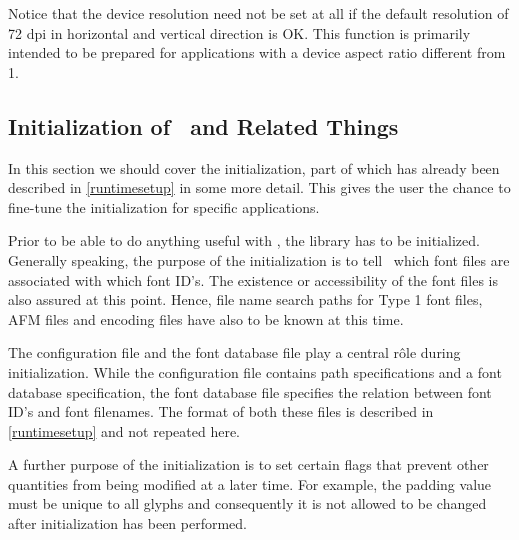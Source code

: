Notice that the device resolution need not be set at all if the default
resolution of 72 dpi in horizontal and vertical direction is OK. This function
is primarily intended to be prepared for applications with a device aspect
ratio different from 1.
 
\subsection{Initialization of \tonelib\ and Related Things}
\label{initialization}%
In this section we should cover the initialization, part of which has already
been described in \ref{runtimesetup} in some more detail. This gives the user
the chance to fine-tune the initialization for specific applications.

Prior to be able to do anything useful with \tonelib, the library has to be
initialized. Generally speaking, the purpose of the initialization is to tell
\tonelib\ which font files are associated with which font ID's. The existence
or accessibility of the font files is also assured at this point. Hence, file
name search paths for Type 1 font files, AFM files and encoding files have
also to be known at this time. 

The configuration file and the font database file play a central  r\^ole
during initialization. While the configuration file contains path
specifications and a font database specification, the font database file
specifies the relation between font ID's and font filenames.
The format of both these files is described in \ref{runtimesetup} and not
repeated here. 

A further purpose of the initialization is to set certain flags that prevent
other quantities from being modified at a later time. For example, the padding
value must be unique to all glyphs and consequently it is not allowed to be
changed after initialization has been performed.

